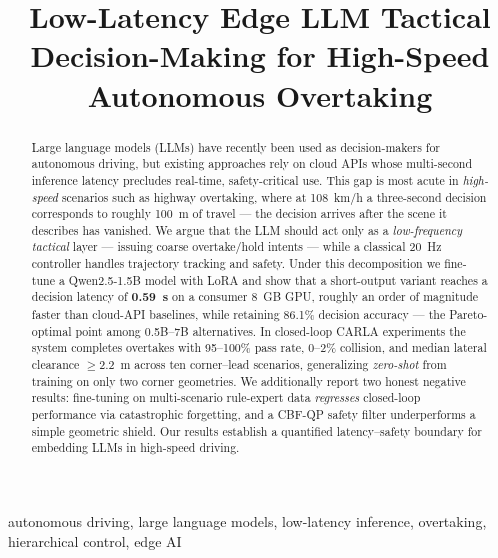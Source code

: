 \documentclass[conference]{IEEEtran}
\begin{document}
\title{Low-Latency Edge LLM Tactical Decision-Making for High-Speed Autonomous Overtaking}

\author{
}

\maketitle

\begin{abstract}
Large language models (LLMs) have recently been used as decision-makers for
autonomous driving, but existing approaches rely on cloud APIs whose
multi-second inference latency precludes real-time, safety-critical use. This
gap is most acute in \emph{high-speed} scenarios such as highway overtaking,
where at 108~km/h a three-second decision corresponds to roughly 100~m of
travel --- the decision arrives after the scene it describes has vanished. We
argue that the LLM should act only as a \emph{low-frequency tactical} layer ---
issuing coarse overtake/hold intents --- while a classical 20~Hz controller
handles trajectory tracking and safety. Under this decomposition we fine-tune a
Qwen2.5-1.5B model with LoRA and show that a short-output variant reaches a
decision latency of \textbf{0.59~s} on a consumer 8~GB GPU, roughly an order of
magnitude faster than cloud-API baselines, while retaining 86.1\% decision
accuracy --- the Pareto-optimal point among 0.5B--7B alternatives. In
closed-loop CARLA experiments the system completes overtakes with 95--100\%
pass rate, 0--2\% collision, and median lateral clearance $\geq$2.2~m across ten
corner--lead scenarios, generalizing \emph{zero-shot} from training on only two
corner geometries. We additionally report two honest negative results:
fine-tuning on multi-scenario rule-expert data \emph{regresses} closed-loop
performance via catastrophic forgetting, and a CBF-QP safety filter
underperforms a simple geometric shield. Our results establish a quantified
latency--safety boundary for embedding LLMs in high-speed driving.
\end{abstract}

\begin{IEEEkeywords}
autonomous driving, large language models, low-latency inference, overtaking, hierarchical control, edge AI
\end{IEEEkeywords}
\end{document}
